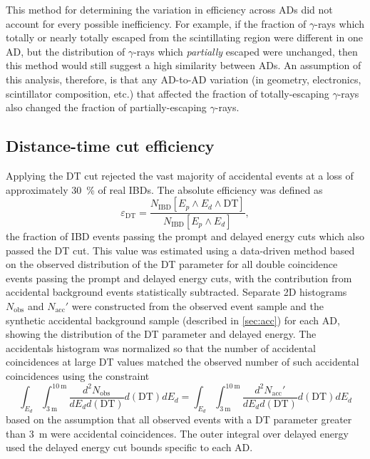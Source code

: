 This method for determining the variation in efficiency across ADs
did not account for every possible inefficiency.
For example, if the fraction of $\gamma$-rays which totally or nearly totally
escaped from the scintillating region were different in one AD,
but the distribution of $\gamma$-rays which \textit{partially} escaped were unchanged,
then this method would still suggest a high similarity between ADs.
An assumption of this analysis, therefore, is that any AD-to-AD variation
(in geometry, electronics, scintillator composition, etc.)
that affected the fraction of totally-escaping $\gamma$-rays
also changed the fraction of partially-escaping $\gamma$-rays.

\subsection{Distance-time cut efficiency}
\label{subsec:eff_DT}

Applying the DT cut rejected the vast majority of accidental events
at a loss of approximately \SI{30}{\percent} of real IBDs.
The absolute efficiency was defined as
\begin{equation}\label{eq:abs_DT_eff}
    \varepsilon_{\text{DT}} = \frac{
        N_\text{IBD}[E_p \wedge E_d \wedge \text{DT}]
    }%
    {
        N_\text{IBD}[E_p \wedge E_d]
    },
\end{equation}
the fraction of IBD events passing the prompt and delayed energy cuts
which also passed the DT cut.
This value was estimated using a data-driven method
based on the observed distribution of the DT parameter
for all double coincidence events passing the prompt and delayed energy cuts,
with the contribution from accidental background events
statistically subtracted.
Separate 2D histograms $N_\text{obs}$ and $N_\text{acc}'$
were constructed from the observed event sample
and the synthetic accidental background sample (described in \cref{sec:acc}) for each AD,
showing the distribution of the DT parameter and delayed energy.
The accidentals histogram was normalized so that
the number of accidental coincidences at large DT values
matched the observed number of such accidental coincidences
using the constraint
\begin{equation}\label{eq:acc_sub_normalized}
    \int_{E_d}\int_{\SI{3}{\m}}^{\SI{10}{\m}}
    \frac{d^2N_\text{obs}}{dE_d d(\text{DT})}
    d(\text{DT}) dE_d
    =
    \int_{E_d}\int_{\SI{3}{\m}}^{\SI{10}{\m}}
    \frac{d^2N_\text{acc}'}{dE_d d(\text{DT})}
    d(\text{DT}) dE_d
\end{equation}
based on the assumption that all observed events
with a DT parameter greater than \SI{3}{\m}
were accidental coincidences.
The outer integral over delayed energy
used the delayed energy cut bounds specific to each AD.

